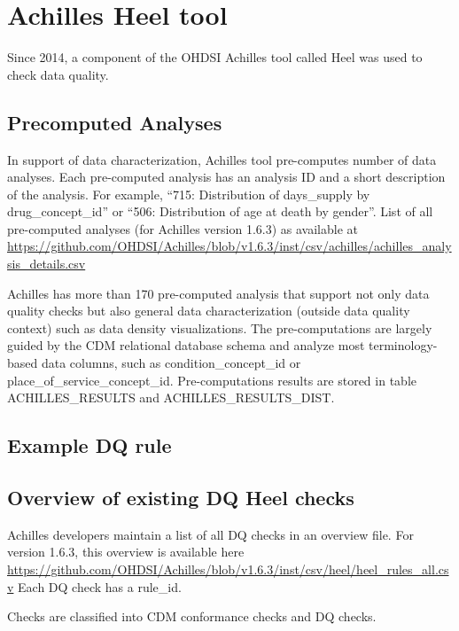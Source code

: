 \documentclass[]{book}
\begin{document}
\section{Achilles Heel tool}\label{achilles-heel-tool}

Since 2014, a component of the OHDSI Achilles tool called Heel was used
to check data quality.\citep{huser_methods_2018}

\subsection{Precomputed Analyses}\label{precomputed-analyses}

In support of data characterization, Achilles tool pre-computes number
of data analyses. Each pre-computed analysis has an analysis ID and a
short description of the analysis. For example, ``715: Distribution of
days\_supply by drug\_concept\_id'' or ``506: Distribution of age at
death by gender''. List of all pre-computed analyses (for Achilles
version 1.6.3) as available at
\url{https://github.com/OHDSI/Achilles/blob/v1.6.3/inst/csv/achilles/achilles_analysis_details.csv}

Achilles has more than 170 pre-computed analysis that support not only
data quality checks but also general data characterization (outside data
quality context) such as data density visualizations. The
pre-computations are largely guided by the CDM relational database
schema and analyze most terminology-based data columns, such as
condition\_concept\_id or place\_of\_service\_concept\_id.
Pre-computations results are stored in table ACHILLES\_RESULTS and
ACHILLES\_RESULTS\_DIST.

\subsection{Example DQ rule}\label{example-dq-rule}

\subsection{Overview of existing DQ Heel
checks}\label{overview-of-existing-dq-heel-checks}

Achilles developers maintain a list of all DQ checks in an overview
file. For version 1.6.3, this overview is available here
\url{https://github.com/OHDSI/Achilles/blob/v1.6.3/inst/csv/heel/heel_rules_all.csv}
Each DQ check has a rule\_id.

Checks are classified into CDM conformance checks and DQ checks.
\end{document}
